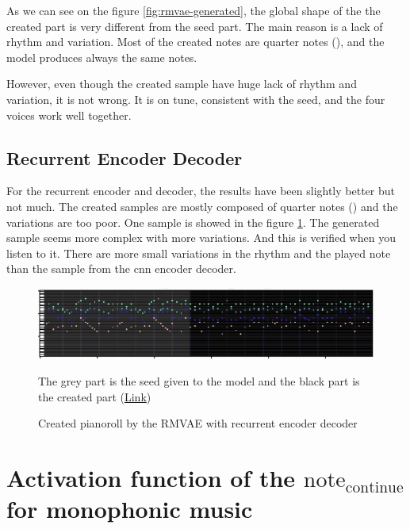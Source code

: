 \documentclass[12pt]{report}
\begin{document}
As we can see on the figure \ref{fig:rmvae-generated}, the global shape of the the created part is very different from the seed part.
The main reason is a lack of rhythm and variation.
Most of the created notes are quarter notes (\musQuarter), and the model produces always the same notes.

However, even though the created sample have huge lack of rhythm and variation, it is not wrong.
It is on tune, consistent with the seed, and the four voices work well together.

\subsection{Recurrent Encoder Decoder}

For the recurrent encoder and decoder, the results have been slightly better but not much.
The created samples are mostly composed of quarter notes (\musQuarter) and the variations are too poor.
One sample is showed in the figure \ref{fig:rrmvae-generated}.
The generated sample seems more complex with more variations.
And this is verified when you listen to it.
There are more small variations in the rhythm and the played note than the sample from the cnn encoder decoder.

\begin{figure}[htpb]
    \centering
    \includegraphics[width=\textwidth]{images/generated_midis/RRMVAE/generated-rnn.jpg}
    \caption{Created pianoroll by the RMVAE with recurrent encoder decoder}
    The grey part is the seed given to the model and the black part is the created part   (\href{https://github.com/ValentinVignal/midiGenerator/blob/master/samples/results/generated-pianoroll-rnn.mid}{Link})
    \label{fig:rrmvae-generated}
\end{figure}




\section{Activation function of the $\text{note}_{\text{continue}}$ for monophonic music}
\label{sec:results:note-continue}
\end{document}
